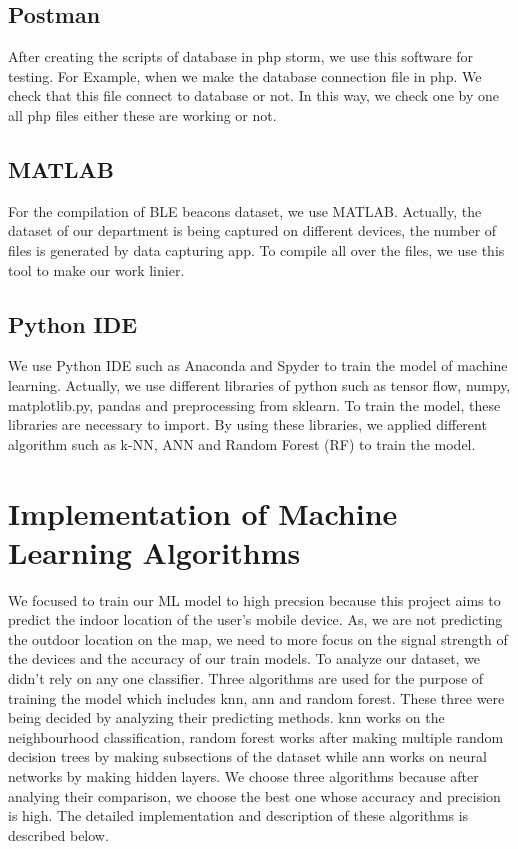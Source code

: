 \subsection{Postman}
After creating the scripts of database in php storm, we use this software for testing. For Example, when we make the database connection file in php. We check that this file connect to database or not. In this way, we check one by one all php files either these are working or not.

\subsection{MATLAB}
For the compilation of BLE beacons dataset, we use MATLAB. Actually, the dataset of our department is being captured on different devices, the number of files is generated by data capturing app. To compile all over the files, we use this tool to make our work linier.

\subsection{Python IDE}
We use Python IDE such as Anaconda and Spyder to train the model of machine learning. Actually, we use different libraries of python such as tensor flow, numpy, matplotlib.py, pandas and preprocessing from sklearn. To train the model, these libraries are necessary to import. By using these libraries, we applied different algorithm such as k-NN, ANN and Random Forest (RF) to train the model.
\clearpage

\section{Implementation of Machine Learning Algorithms}

We focused to train our ML model to high precsion because this project aims to predict the indoor location of the user's mobile device. As, we are not predicting the outdoor location on the map, we need to more focus on the signal strength of the devices and the accuracy of our train models. To analyze our dataset, we didn't rely on any one classifier. Three algorithms are used for the purpose of training the model which includes knn, ann and random forest. These three were being decided by analyzing their predicting methods. knn works on the neighbourhood classification, random forest works after making multiple random decision trees by making subsections of the dataset while ann works on neural networks by making hidden layers. We choose three algorithms because after analying their comparison, we choose the best one whose accuracy and precision is high. The detailed implementation and description of these algorithms is described below.

